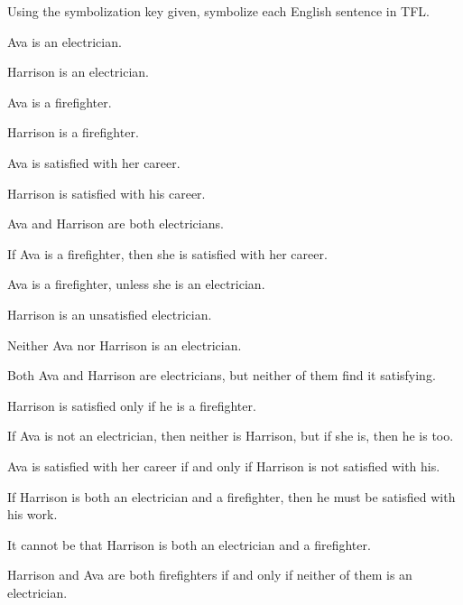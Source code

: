 \begin{practiceproblems}
\problempart Using the symbolization key given, symbolize each English sentence in TFL.\label{pr:avacareer}
	\begin{ekey}
		\item[E_1] Ava is an electrician.
		\item[E_2] Harrison is an electrician.
		\item[F_1] Ava is a firefighter.
		\item[F_2] Harrison is a firefighter.
		\item[S_1] Ava is satisfied with her career.
		\item[S_2] Harrison is satisfied with his career.
	\end{ekey}
\begin{problemslist}
\item Ava and Harrison are both electricians.
\item If Ava is a firefighter, then she is satisfied with her career.
\item Ava is a firefighter, unless she is an electrician.
\item Harrison is an unsatisfied electrician.
\item Neither Ava nor Harrison is an electrician.
\item Both Ava and Harrison are electricians, but neither of them find it satisfying.
\item Harrison is satisfied only if he is a firefighter.
\item If Ava is not an electrician, then neither is Harrison, but if she is, then he is too.
\item Ava is satisfied with her career if and only if Harrison is not satisfied with his.
\item If Harrison is both an electrician and a firefighter, then he must be satisfied with his work.
\item It cannot be that Harrison is both an electrician and a firefighter.
\item Harrison and Ava are both firefighters if and only if neither of them is an electrician.
\end{problemslist}



\end{practiceproblems}
